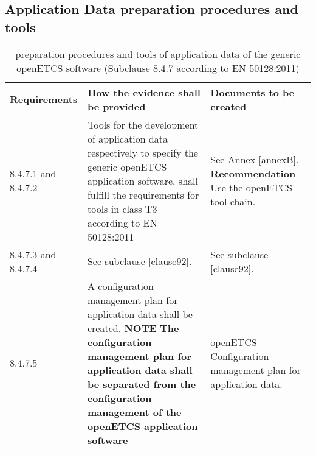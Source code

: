 \documentclass{template/openetcs_report}
\begin{document}
\subsection{Application Data preparation procedures and tools}
{\footnotesize\sffamily\centering
\begin{longtable}{|p{2cm}|p{9cm}|p{3cm}|}
\caption{preparation procedures and tools of application data of the generic openETCS software (Subclause 8.4.7 according to EN 50128:2011)}\\
\hline
\bfseries Requirements & \bfseries How the evidence shall be provided & \bfseries Documents to be created\\
\hline
\hline
\endhead
\hline
\endfoot

8.4.7.1 and 8.4.7.2 & Tools for the development of application data respectively to specify the generic openETCS application software, shall fulfill the requirements for tools in class T3 according to EN 50128:2011
& See Annex \ref{annexB}.
\textbf{Recommendation}\linebreak
Use the openETCS tool chain.\\ 
\hline
8.4.7.3 and 8.4.7.4 & See subclause \ref{clause92}. & See subclause \ref{clause92}.\\ 
\hline
8.4.7.5 & A configuration management plan for application data shall be created.
\linebreak
\linebreak
\textbf{NOTE}\linebreak
\textbf{The configuration management plan for application data shall be separated from the configuration management of the openETCS application software}
& openETCS Configuration management plan for application data.\\ 
\hline
\end{longtable}}
\end{document}
